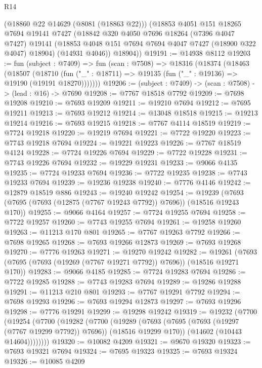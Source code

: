 \begin{lexlean}{R14}
\begin{coremodule}
      (@18860 @22 @14629 (@8081 (@18863 @22)))
      (@18853
        @4051
        @151
        @18265
        @7694
        @19141
        @7427
        (@18842
          @320
          @4050
          @7696
          @18264
          (@7396 @4047 @7427)
          @19141
          (@18853 @4048 @151 @7694 @7694 @4047 @7427 (@18900 @322 @4047) @18904)
          (@14931 @4046))
        @18904))
@19191 := @14938 @8112
@19203 := fun (subject : @7409) =>
  fun (scan : @7508) =>
  @18316
    (@18374
      (@18463
        (@18507
          (@18710 (fun ("_" : @18711) => @19135 (fun ("_" : @19136) => @19190 (@19191 @18270)))))))
@19206 := (subject : @7409) -> (scan : @7508) -> (lead : @16) -> @7690
@19208 := @7767 @18518 @7792
@19209 := @7698 @19208
@19210 := @7693 @19209
@19211 := @19210 @7694
@19212 := @7695 @19211
@19213 := @7693 @19212
@19214 := @13048 @18518
@19215 := @19213 @19214
@19216 := @7693 @19215
@19218 := @7767 @4114 @18519
@19219 := @7724 @19218
@19220 := @19219 @7694
@19221 := @7722 @19220
@19223 := @7743 @19218 @7694
@19224 := @19221 @19223
@19226 := @7767 @18519 @4124
@19228 := @7724 @19226 @7694
@19229 := @7722 @19228
@19231 := @7743 @19226 @7694
@19232 := @19229 @19231
@19233 := @9066 @4135
@19235 := @7724 @19233 @7694
@19236 := @7722 @19235
@19238 := @7743 @19233 @7694
@19239 := @19236 @19238
@19240 := @7776 @4146
@19242 := @12879 @18519 @886
@19243 := @19240 @19242
@19254 := @19239 (@7693 (@7695 (@7693 (@12875 (@7767 @19243 @7792)) @7696)) (@18516 @19243 @170))
@19255 := @9066 @4164
@19257 := @7724 @19255 @7694
@19258 := @7722 @19257
@19260 := @7743 @19255 @7694
@19261 := @19258 @19260
@19263 := @11213 @170 @801
@19265 := @7767 @19263 @7792
@19266 := @7698 @19265
@19268 := @7693 @19266 @12873
@19269 := @7693 @19268
@19270 := @7776 @19263
@19271 := @19270 @19242
@19282 := @19261 (@7693 (@7695 (@7693 (@19269 (@7767 @19271 @7792)) @7696)) (@18516 @19271 @170))
@19283 := @9066 @4185
@19285 := @7724 @19283 @7694
@19286 := @7722 @19285
@19288 := @7743 @19283 @7694
@19289 := @19286 @19288
@19291 := @11213 @210 @801
@19293 := @7767 @19291 @7792
@19294 := @7698 @19293
@19296 := @7693 @19294 @12873
@19297 := @7693 @19296
@19298 := @7776 @19291
@19299 := @19298 @19242
@19319 := @19232
    (@7700
      (@19254
        (@7700
          (@19282
            (@7700
              (@19289
                (@7693 (@7695 (@7693 (@19297 (@7767 @19299 @7792)) @7696)) (@18516 @19299 @170))
                (@14602 (@10443 @14604))))))))
@19320 := @10082 @4209
@19321 := @9670 @19320
@19323 := @7693 @19321 @7694
@19324 := @7695 @19323
@19325 := @7693 @19324
@19326 := @10085 @4209

\end{coremodule}
\end{lexlean}
